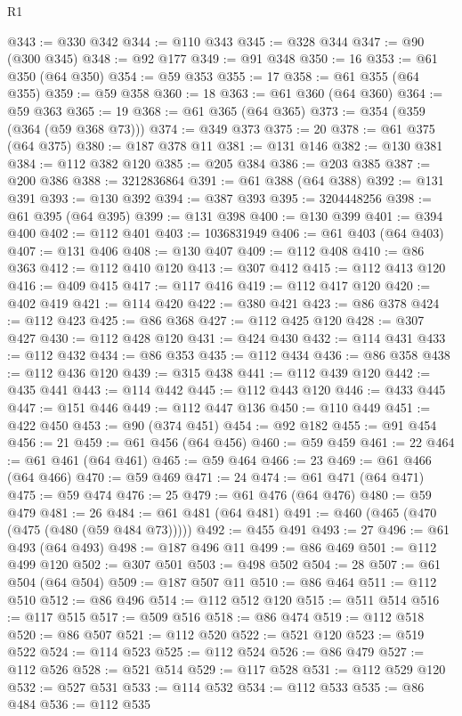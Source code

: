 \begin{lexlean}{R1}
\begin{coremodule}
@343 := @330 @342
@344 := @110 @343
@345 := @328 @344
@347 := @90 (@300 @345)
@348 := @92 @177
@349 := @91 @348
@350 := 16
@353 := @61 @350 (@64 @350)
@354 := @59 @353
@355 := 17
@358 := @61 @355 (@64 @355)
@359 := @59 @358
@360 := 18
@363 := @61 @360 (@64 @360)
@364 := @59 @363
@365 := 19
@368 := @61 @365 (@64 @365)
@373 := @354 (@359 (@364 (@59 @368 @73)))
@374 := @349 @373
@375 := 20
@378 := @61 @375 (@64 @375)
@380 := @187 @378 @11
@381 := @131 @146
@382 := @130 @381
@384 := @112 @382 @120
@385 := @205 @384
@386 := @203 @385
@387 := @200 @386
@388 := 3212836864
@391 := @61 @388 (@64 @388)
@392 := @131 @391
@393 := @130 @392
@394 := @387 @393
@395 := 3204448256
@398 := @61 @395 (@64 @395)
@399 := @131 @398
@400 := @130 @399
@401 := @394 @400
@402 := @112 @401
@403 := 1036831949
@406 := @61 @403 (@64 @403)
@407 := @131 @406
@408 := @130 @407
@409 := @112 @408
@410 := @86 @363
@412 := @112 @410 @120
@413 := @307 @412
@415 := @112 @413 @120
@416 := @409 @415
@417 := @117 @416
@419 := @112 @417 @120
@420 := @402 @419
@421 := @114 @420
@422 := @380 @421
@423 := @86 @378
@424 := @112 @423
@425 := @86 @368
@427 := @112 @425 @120
@428 := @307 @427
@430 := @112 @428 @120
@431 := @424 @430
@432 := @114 @431
@433 := @112 @432
@434 := @86 @353
@435 := @112 @434
@436 := @86 @358
@438 := @112 @436 @120
@439 := @315 @438
@441 := @112 @439 @120
@442 := @435 @441
@443 := @114 @442
@445 := @112 @443 @120
@446 := @433 @445
@447 := @151 @446
@449 := @112 @447 @136
@450 := @110 @449
@451 := @422 @450
@453 := @90 (@374 @451)
@454 := @92 @182
@455 := @91 @454
@456 := 21
@459 := @61 @456 (@64 @456)
@460 := @59 @459
@461 := 22
@464 := @61 @461 (@64 @461)
@465 := @59 @464
@466 := 23
@469 := @61 @466 (@64 @466)
@470 := @59 @469
@471 := 24
@474 := @61 @471 (@64 @471)
@475 := @59 @474
@476 := 25
@479 := @61 @476 (@64 @476)
@480 := @59 @479
@481 := 26
@484 := @61 @481 (@64 @481)
@491 := @460 (@465 (@470 (@475 (@480 (@59 @484 @73)))))
@492 := @455 @491
@493 := 27
@496 := @61 @493 (@64 @493)
@498 := @187 @496 @11
@499 := @86 @469
@501 := @112 @499 @120
@502 := @307 @501
@503 := @498 @502
@504 := 28
@507 := @61 @504 (@64 @504)
@509 := @187 @507 @11
@510 := @86 @464
@511 := @112 @510
@512 := @86 @496
@514 := @112 @512 @120
@515 := @511 @514
@516 := @117 @515
@517 := @509 @516
@518 := @86 @474
@519 := @112 @518
@520 := @86 @507
@521 := @112 @520
@522 := @521 @120
@523 := @519 @522
@524 := @114 @523
@525 := @112 @524
@526 := @86 @479
@527 := @112 @526
@528 := @521 @514
@529 := @117 @528
@531 := @112 @529 @120
@532 := @527 @531
@533 := @114 @532
@534 := @112 @533
@535 := @86 @484
@536 := @112 @535

\end{coremodule}
\end{lexlean}
